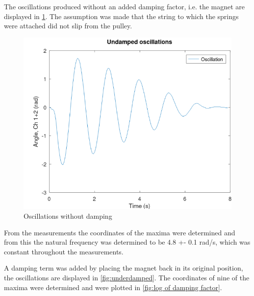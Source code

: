 The oscillations produced without an added damping factor, i.e. the magnet are displayed in \ref{fig:undamped_oscillations}. The assumption was made that the string to which the springs were attached did not slip from the pulley.

\begin{figure}[h!]
  \centering
  \includegraphics[width=1\textwidth]{oscillations/images/Undamped_Oscillations}
  \caption{Oscillations without damping}
  \label{fig:undamped_oscillations}
\end{figure}

From the measurements the coordinates of the maxima were determined and from this the natural frequency was determined to be 4.8 +- 0.1 rad/s, which was constant throughout the measurements.

A damping term was added by placing the magnet back in its original position, the oscillations are displayed in \ref{fig:underdamped}. The coordinates of nine of the maxima were determined and were plotted in \ref{fig:log of damping factor}. 

